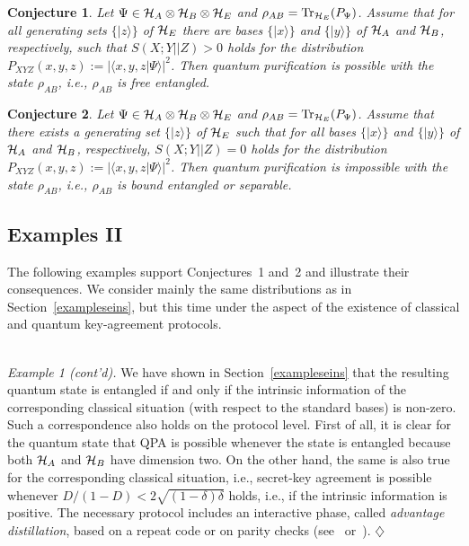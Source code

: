 \documentclass{article}
\newtheorem{con}{Conjecture}
\newcommand{\exend}{\hspace*{\fill} $\diamondsuit$}
\newcommand{\Tr}{{\rm Tr}}
\newcommand{\HA}{{\cal H}_{{A}}}
\newcommand{\HB}{{\cal H}_{{B}}}
\newcommand{\HE}{{\cal H}_{{E}}}
\newcommand{\cd}{{D}}
\newcommand{\noi}{\noindent}
\newcommand{\de}{\delta}
\begin{document}
\begin{con}\label{conprot}
Let $\Psi\in\HA\otimes\HB\otimes\HE$ and $\rho_{AB}=\Tr_{\HE}(P_{\Psi})$.
Assume that  for all generating sets  $\{|z\rangle\}$ of $\HE$ there 
are bases $\{|x\rangle\}$ and $\{|y\rangle\}$ of $\HA$ and $\HB$, respectively, 
such that 
$
S(X;Y||Z)>0
$
holds for the distribution $P_{XYZ}(x,y,z):=|\langle x,y,z|\Psi\rangle|^2$.
Then quantum purification is possible with the state $\rho_{AB}$, 
i.e., $\rho_{AB}$ is free entangled.
\end{con}

\begin{con}
Let $\Psi\in\HA\otimes\HB\otimes\HE$ and $\rho_{AB}=\Tr_{\HE}(P_{\Psi})$.
Assume that  there exists a  generating set $\{|z\rangle\}$ of $\HE$
such that for all 
 bases $\{|x\rangle\}$ and $\{|y\rangle\}$ of $\HA$ and $\HB$, respectively, 
$
S(X;Y||Z)=0
$
holds for the distribution $P_{XYZ}(x,y,z):=|\langle x,y,z|\Psi\rangle|^2$.
Then quantum purification is impossible with the state $\rho_{AB}$, 
i.e., $\rho_{AB}$ is bound entangled or  separable.
\end{con}






  \subsection{Examples II}
\label{exampleszwei}

The following examples 
support  Conjectures~1 and~2 and illustrate  their
 consequences.
We consider mainly the same distributions as in Section~\ref{exampleseins},
but this time under the aspect of the existence of classical and quantum 
key-agreement protocols. 
\\ \






\noi
{\it Example 1 (cont'd).}
We have shown in Section~\ref{exampleseins} that the 
resulting quantum state is entangled if and only if the intrinsic information
of the corresponding classical situation (with respect to the standard 
bases) is non-zero. Such a correspondence also holds on the 
protocol level. First of all, it is clear  for the quantum state that 
QPA is possible whenever the state is entangled because  both $\HA$ and $\HB$
have dimension two.
On the other hand,  the same is also true for 
the corresponding classical situation, i.e.,  secret-key agreement is possible 
whenever
$
\cd/(1-\cd)<2\sqrt{(1-\de)\de}
$
holds, i.e., if the intrinsic information is positive.
The necessary protocol includes an interactive phase, called
{\em advantage distillation}, based on a repeat code or 
on parity checks (see~\cite{ka}
or~\cite{diss}). 
\exend
\ \\ 
\end{document}
